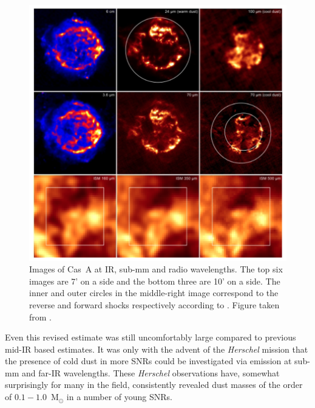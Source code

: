 \begin{figure}
\centering
\includegraphics[clip=true,scale=0.425,trim= 0 0 0 0]{chapters/chapter1/figs/CasA.png}
\caption{Images of Cas~A at IR, sub-mm and radio wavelengths.  The top six images are 7' on a side and the bottom three are 10' on a side.  The inner and outer circles in the middle-right image correspond to the reverse and forward shocks respectively according to \citet{Gotthelf2001}.  Figure taken from \citet{Barlow2010}.}
\label{fig:CasA}
\end{figure}


Even this revised estimate was still uncomfortably large compared to previous mid-IR  based estimates.  
It was only with the advent of the \textit{Herschel} mission that the presence of cold dust in more SNRs could  be investigated via emission at sub-mm and far-IR wavelengths.  These \textit{Herschel} observations have, somewhat surprisingly for many in the field, consistently revealed dust masses of the order of $0.1-1.0$~M$_{\odot}$ in a number of young SNRs.


